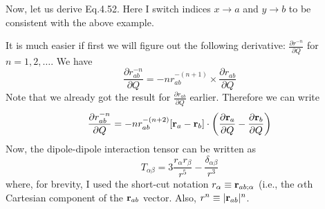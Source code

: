 \documentclass{exam}
\newcommand{\fderiv}[2]{\ensuremath{
\frac{\partial #1}{\partial #2}}}
\begin{document}
\begin{questions}
\begin{solution}
Now, let us derive Eq.4.52. Here I switch indices $x\rightarrow a$ and $y\rightarrow b$ 
to be consistent with the above example. 

It is much easier if first we will figure out the following
derivative: $\fderiv{r^{-n}}{Q}$ for $n=1,2,\ldots$. We have
%
\begin{equation}
\fderiv{r_{ab}^{-n}}{Q} = -n r_{ab}^{-(n+1)} \times \fderiv{r_{ab}}{Q}
\end{equation}
%
Note that we already got the result for $\fderiv{r_{ab}}{Q}$ earlier. Therefore we can write
%
\begin{equation}
\fderiv{r_{ab}^{-n}}{Q} = -n r_{ab}^{-(n+2)} [ {\bf r}_a - {\bf r}_b ] \cdot \left(\fderiv{{\bf r}_a}{Q} - \fderiv{{\bf r}_b}{Q}\right)
\end{equation}
%
Now, the dipole-dipole interaction tensor can be written as
%
\begin{equation}
 T_{\alpha\beta} = 3\frac{r_\alpha r_\beta}{r^5} - \frac{\delta_{\alpha\beta}}{r^3}
\end{equation}
%
where, for brevity, I used the short-cut notation $r_\alpha \equiv {\bf r}_{ab;\alpha}$ (i.e., the $\alpha$th Cartesian component
of the ${\bf r}_{ab}$ vector. Also, $r^n \equiv \vert {\bf r}_{ab} \vert^n $.


\end{solution}
\end{questions}
\end{document}
